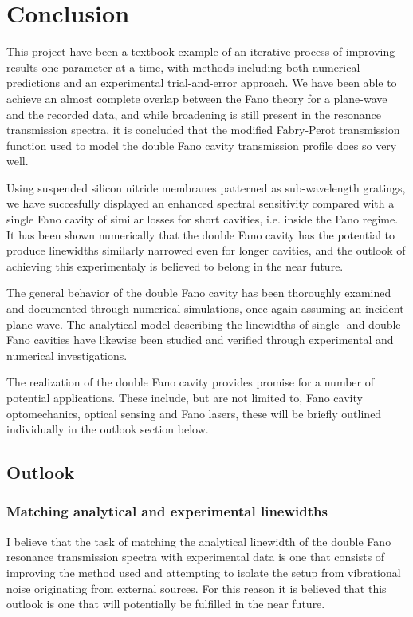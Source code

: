 \section{Conclusion}

This project have been a textbook example of an iterative process of improving results one parameter at a time, with methods including both numerical predictions and an experimental trial-and-error approach. We have been able to achieve an almost complete overlap between the Fano theory for a plane-wave and the recorded data, and while broadening is still present in the resonance transmission spectra, it is concluded that the modified Fabry-Perot transmission function used to model the double Fano cavity transmission profile does so very well.

Using suspended silicon nitride membranes patterned as sub-wavelength gratings, we have succesfully displayed an enhanced spectral sensitivity compared with a single Fano cavity of similar losses for short cavities, i.e. inside the Fano regime. It has been shown numerically that the double Fano cavity has the potential to produce linewidths similarly narrowed even for longer cavities, and the outlook of achieving this experimentaly is believed to belong in the near future. 

The general behavior of the double Fano cavity has been thoroughly examined and documented through numerical simulations, once again assuming an incident plane-wave. The analytical model describing the linewidths of single- and double Fano cavities have likewise been studied and verified through experimental and numerical investigations. 

The realization of the double Fano cavity provides promise for a number of potential applications. These include, but are not limited to, Fano cavity optomechanics, optical sensing and Fano lasers, these will be briefly outlined individually in the outlook section below. 

\subsection{Outlook}

\subsubsection{Matching analytical and experimental linewidths}

I believe that the task of matching the analytical linewidth of the double Fano resonance transmission spectra with experimental data is one that consists of improving the method used and attempting to isolate the setup from vibrational noise originating from external sources. For this reason it is believed that this outlook is one that will potentially be fulfilled in the near future. 

